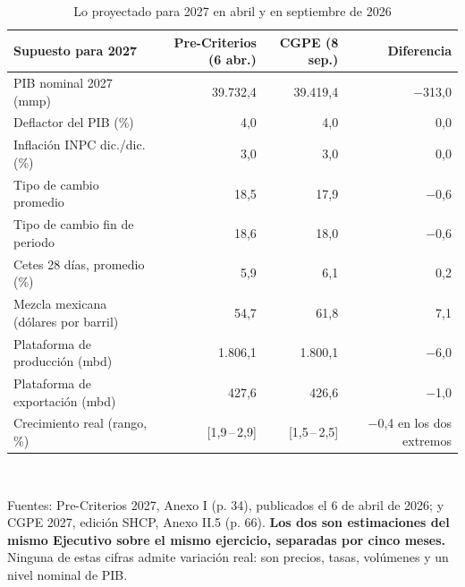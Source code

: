 \begin{table}[htbp]\centering\small
\caption{Lo proyectado para 2027 en abril y en septiembre de 2026}\label{cua:precrit}
\begin{tabular}{lrrr}
\toprule
Supuesto para 2027 & Pre-Criterios (6 abr.) & CGPE (8 sep.) & Diferencia \\
\midrule
PIB nominal 2027 (mmp) & 39.732,4 & 39.419,4 & $-$313,0 \\
Deflactor del PIB (\%) & 4,0 & 4,0 & 0,0 \\
Inflación INPC dic./dic. (\%) & 3,0 & 3,0 & 0,0 \\
Tipo de cambio promedio & 18,5 & 17,9 & $-$0,6 \\
Tipo de cambio fin de periodo & 18,6 & 18,0 & $-$0,6 \\
Cetes 28 días, promedio (\%) & 5,9 & 6,1 & 0,2 \\
Mezcla mexicana (dólares por barril) & 54,7 & 61,8 & 7,1 \\
Plataforma de producción (mbd) & 1.806,1 & 1.800,1 & $-$6,0 \\
Plataforma de exportación (mbd) & 427,6 & 426,6 & $-$1,0 \\
Crecimiento real (rango, \%) & [1,9\,--\,2,9] & [1,5\,--\,2,5] & $-$0,4 en los dos extremos \\
\bottomrule
\end{tabular}
\\[2pt]\begin{minipage}{0.92\textwidth}\scriptsize Fuentes: Pre-Criterios 2027, Anexo I (p. 34), publicados el 6 de abril de 2026; y CGPE 2027, edición SHCP, Anexo II.5 (p. 66). \textbf{Los dos son estimaciones del mismo Ejecutivo sobre el mismo ejercicio, separadas por cinco meses.} Ninguna de estas cifras admite variación real: son precios, tasas, volúmenes y un nivel nominal de PIB.\end{minipage}
\end{table}

